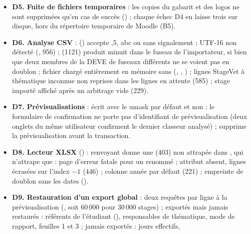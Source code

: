 \documentclass[11pt,a4paper]{article}
\newcommand{\grav}[1]{\textbf{\textcolor{#1}{\textbullet}}}
\newcommand{\mineure}{\grav{gray}}
\begin{document}
\begin{itemize}
    l'enregistrement et refuser le formulaire avec un message ; en génération, encapsuler et
    renvoyer une erreur lisible.
  \item[\mineure] \textbf{D5. Fuite de fichiers temporaires} : les copies du gabarit et des logos
    ne sont supprimées qu'en cas de succès () ; chaque échec D4 en laisse
    trois sur disque, hors du répertoire temporaire de Moodle (B5).
  \item[\mineure] \textbf{D6. Analyse CSV} : 
    () accepte ,5\fg{}, \og abc\fg{} ou \fg{} sans
    signalement ; UTF-16 non détecté (, 956) ;  (1121)
    produit minuit dans le fuseau de l'importateur, si bien que deux membres de la DEVE de fuseaux
    différents ne se voient pas en doublon ; fichier chargé entièrement en mémoire sans
     (, ,
    ) ; lignes StageVet à thématique inconnue non reprises dans les
    lignes en attente (585) ;  stage importé\fg{} affiché après un arbitrage vide (229).
  \item[\mineure] \textbf{D7. Prévisualisations} :  écrit avec le
    umask par défaut et non  ; le formulaire de confirmation ne porte
    pas d'identifiant de prévisualisation (deux onglets du même utilisateur confirment le dernier
    classeur analysé) ;  supprime la prévisualisation avant la
    transaction.
  \item[\mineure] \textbf{D8. Lecteur XLSX} () : 
    renvoyant  donne une  (403) non attrapée dans
    , qui n'attrape que  : page d'erreur
    fatale pour un  renommé ; attribut  absent, lignes écrasées sur l'index
    $-1$ (446) ; colonne \og année\fg{} par défaut (221) ; empreinte de doublon sans les dates
    ().
  \item[\mineure] \textbf{D9. Restauration d'un export global} : deux requêtes par ligne à la
    prévisualisation (, soit 60\,000 pour 30\,000 stages) ;
    exportés mais jamais restaurés : référents de l'étudiant (), responsables
    de thématique, mode de rapport, feuilles 1 et 3 ; jamais exportés : jours effectifs,

\end{itemize}
\end{document}

